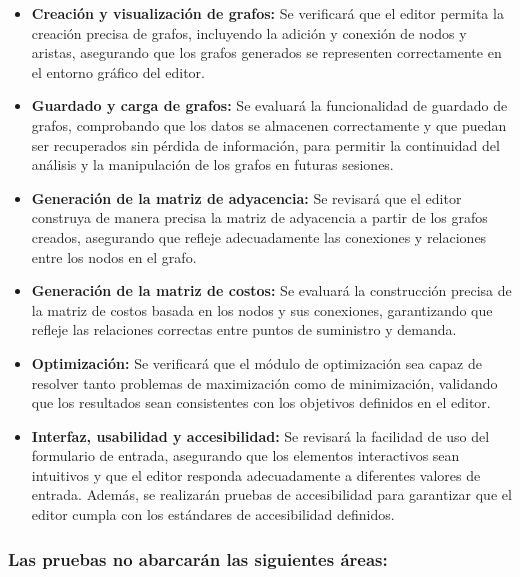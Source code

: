 \documentclass[stu, 12pt, letterpaper, donotrepeattitle, floatsintext, natbib]{apa7}
\begin{document}
\begin{itemize}
    \item \textbf{Creación y visualización de grafos:} Se verificará que el editor permita la creación precisa de grafos, incluyendo la adición y conexión de nodos y aristas, asegurando que los grafos generados se representen correctamente en el entorno gráfico del editor.

    \item \textbf{Guardado y carga de grafos:} Se evaluará la funcionalidad de guardado de grafos, comprobando que los datos se almacenen correctamente y que puedan ser recuperados sin pérdida de información, para permitir la continuidad del análisis y la manipulación de los grafos en futuras sesiones.

    \item \textbf{Generación de la matriz de adyacencia:} Se revisará que el editor construya de manera precisa la matriz de adyacencia a partir de los grafos creados, asegurando que refleje adecuadamente las conexiones y relaciones entre los nodos en el grafo.

    \item \textbf{Generación de la matriz de costos:} Se evaluará la construcción precisa de la matriz de costos basada en los nodos y sus conexiones, garantizando que refleje las relaciones correctas entre puntos de suministro y demanda.

    \item \textbf{Optimización:} Se verificará que el módulo de optimización sea capaz de resolver tanto problemas de maximización como de minimización, validando que los resultados sean consistentes con los objetivos definidos en el editor.

    \item \textbf{Interfaz, usabilidad y accesibilidad:} Se revisará la facilidad de uso del formulario de entrada, asegurando que los elementos interactivos sean intuitivos y que el editor responda adecuadamente a diferentes valores de entrada. Además, se realizarán pruebas de accesibilidad para garantizar que el editor cumpla con los estándares de accesibilidad definidos.
\end{itemize}

\vspace{1cm}
\subsubsection{Las pruebas no abarcarán las siguientes áreas:}
\end{document}
